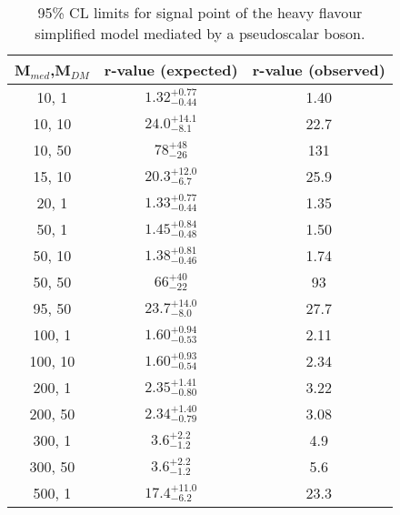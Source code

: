 \begin{table}[h!]
    \caption{%
    95\% CL limits for signal point of the heavy flavour simplified model 
    mediated by a pseudoscalar boson. }
    \label{tab:DMttPS_limits}
    \centering
    \begin{tabular}{ ccc }
        \hline\hline
        M$_{med}$,M$_{DM}$ & r-value (expected) & r-value (observed) \\ 
        \hline
        10, 1   & $1.32_{-0.44}^{+0.77}$ & 1.40 \\
        10, 10  & $24.0_{-8.1}^{+14.1}$  & 22.7 \\
        10, 50  & $78_{-26}^{+48}$       & 131  \\
        15, 10  & $20.3_{-6.7}^{+12.0}$  & 25.9 \\
        20, 1   & $1.33_{-0.44}^{+0.77}$ & 1.35 \\
        50, 1   & $1.45_{-0.48}^{+0.84}$ & 1.50 \\
        50, 10  & $1.38_{-0.46}^{+0.81}$ & 1.74 \\
        50, 50  & $66_{-22}^{+40}$       & 93   \\
        95, 50  & $23.7_{-8.0}^{+14.0}$  & 27.7 \\
        100, 1  & $1.60_{-0.53}^{+0.94}$ & 2.11 \\
        100, 10 & $1.60_{-0.54}^{+0.93}$ & 2.34 \\
        200, 1  & $2.35_{-0.80}^{+1.41}$ & 3.22 \\
        200, 50 & $2.34_{-0.79}^{+1.40}$ & 3.08 \\
        300, 1  & $3.6_{-1.2}^{+2.2}$    & 4.9  \\
        300, 50 & $3.6_{-1.2}^{+2.2}$    & 5.6  \\
        500, 1  & $17.4_{-6.2}^{+11.0}$  & 23.3 \\
        \hline\hline
    \end{tabular}
\end{table}

\clearpage

